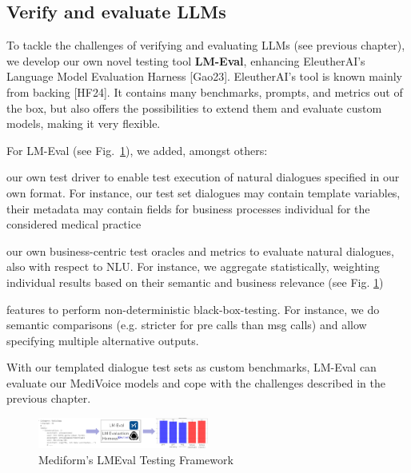 \documentclass[twocolumn]{article}
\begin{document}
\subsection{Verify and evaluate LLMs}

To tackle the challenges of verifying and evaluating LLMs (see previous chapter), we develop our own novel testing tool {\bfseries LM-Eval}, enhancing EleutherAI’s Language Model Evaluation Harness [Gao23]. EleutherAI’s tool is known mainly from backing [HF24]. It contains many benchmarks, prompts, and metrics out of the box, but also offers the possibilities to extend them and evaluate custom models, making it very flexible.

For LM-Eval (see Fig.~\ref{fig:lmeval}), we added, amongst others:
\begin{compactitem}
\item our own test driver to enable test execution of natural dialogues specified in our own format. For instance, our test set dialogues may contain template variables, their metadata may contain fields for business processes individual for the considered medical practice
\item our own business-centric test oracles and metrics to evaluate natural dialogues, also with respect to NLU. For instance, we aggregate statistically, weighting individual results based on their semantic and business relevance (see Fig. \ref{fig:lmeval})
\item features to perform non-deterministic black-box-testing. For instance, we do semantic comparisons (e.g. stricter for pre calls than msg calls) and allow specifying multiple alternative outputs.
\end{compactitem}

With our templated dialogue test sets as custom benchmarks, LM-Eval can evaluate our MediVoice models and cope with the challenges described in the previous chapter.

\begin{figure}[hbt!]
  \begin{center}
\includegraphics[width=0.5\textwidth]{figures/LMEval2}
  \vspace{-8mm}
\caption{Mediform’s LMEval Testing Framework}
\label{fig:lmeval}
\end{center}
\end{figure}
\end{document}
